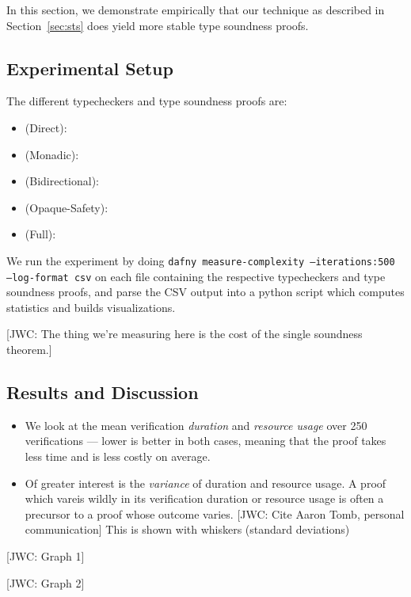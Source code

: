 \documentclass[sigplan,review,screen,anonymous]{acmart}
\newcommand{\comm}[3]{\textcolor{#1}{[#2: #3]}}
\newcommand{\jwc}[1]{\comm{dkgreen}{JWC}{#1}}
\begin{document}
In this section, we demonstrate empirically that our technique as described in Section~\ref{sec:sts}
does yield more stable type soundness proofs.

\subsection*{Experimental Setup}

The different typecheckers and type soundness proofs are:

\begin{itemize}
  \item (Direct):
  \item (Monadic):
  \item (Bidirectional):
  \item (Opaque-Safety):
  \item (Full):
\end{itemize}

We run the experiment by doing \texttt{dafny measure-complexity
--iterations:500 --log-format csv} on each file containing the respective
typecheckers and type soundness proofs, and parse the CSV output into a python
script which computes statistics and builds visualizations.

\jwc{The thing we're measuring here is the cost of the single soundness theorem.}

\subsection*{Results and Discussion}

\begin{itemize}
  \item We look at the mean verification \emph{duration} and \emph{resource usage}
        over 250 verifications --- lower is better in both cases, meaning that the proof takes less time and is less costly on average.
  \item Of greater interest is the \emph{variance} of duration and resource usage. A proof which vareis wildly in its verification duration or resource usage
        is often a precursor to a proof whose outcome varies. \jwc{Cite Aaron Tomb, personal communication} This is shown with whiskers (standard deviations)
\end{itemize}

\jwc{Graph 1}

\jwc{Graph 2}
\end{document}
